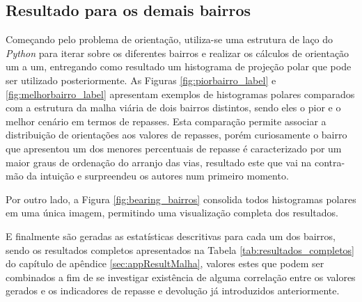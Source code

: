 \subsection{Resultado para os demais bairros}

Começando pelo problema de orientação, utiliza-se uma estrutura de laço do \textit{Python} para iterar sobre os diferentes bairros e realizar os cálculos de orientação um a um, entregando como resultado um histograma de projeção polar que pode ser utilizado posteriormente.
As Figuras \ref{fig:piorbairro_label} e \ref{fig:melhorbairro_label} apresentam exemplos de histogramas polares comparados com a estrutura da malha viária de dois bairros distintos, sendo eles o pior e o melhor cenário em termos de repasses.
Esta comparação permite associar a distribuição de orientações aos valores de repasses, porém curiosamente o bairro que apresentou um dos menores percentuais de repasse é caracterizado por um maior graus de ordenação do arranjo das vias, resultado este que vai na contra-mão da intuição e surpreendeu os autores num primeiro momento.

Por outro lado, a Figura \ref{fig:bearing_bairros} consolida todos histogramas polares em uma única imagem, permitindo uma visualização completa dos resultados.

E finalmente são geradas as estatísticas descritivas para cada um dos bairros, sendo os resultados completos apresentados na Tabela \ref{tab:resultados_completos} do capítulo de apêndice \ref{sec:appResultMalha}, valores estes que podem ser combinados a fim de se investigar existência de alguma correlação entre os valores gerados e os indicadores de repasse e devolução já introduzidos anteriormente. 

